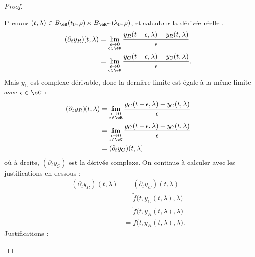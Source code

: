 \begin{proof}
\begin{subproof}
		Prenons \( (t,\lambda)\in B_{\eR}(t_0,\rho)\times B_{\eR^m}(\lambda_0,\rho)\), et calculons la dérivée réelle :
		\begin{subequations}
			\begin{align}
				(\partial_ty_R)(t,\lambda) & =\lim_{\substack{ \epsilon\to 0 \\ \epsilon\in \eR }  }\frac{ y_R(t+\epsilon,\lambda)-y_R(t,\lambda) }{ \epsilon }  \\
				                           & =\lim_{\substack{ \epsilon\to 0 \\ \epsilon\in \eR }  }  \frac{ y_C(t+\epsilon,\lambda)-y_C(t,\lambda) }{ \epsilon }.
			\end{align}
		\end{subequations}
		Mais \( y_C\) est complexe-dérivable, donc la dernière limite est égale à la même limite avec \( \epsilon\in \eC\) :
		\begin{subequations}
			\begin{align}
				(\partial_ty_R)(t,\lambda) & =\lim_{\substack{ \epsilon\to 0 \\ \epsilon\in \eR }  }  \frac{ y_C(t+\epsilon,\lambda)-y_C(t,\lambda) }{ \epsilon }\\
				                           & =\lim_{\substack{ \epsilon\to 0 \\ \epsilon\in \eC }  }  \frac{ y_C(t+\epsilon,\lambda)-y_C(t,\lambda) }{ \epsilon }\\
				                           & =(\partial_ty_C)(t,\lambda)
			\end{align}
		\end{subequations}
		où à droite, \( (\partial_ty_C)\) est la dérivée complexe. On continue à calculer avec les justifications en-dessous :
		\begin{subequations}
			\begin{align}
				(\partial_ty_R)(t,\lambda) & =(\partial_ty_C)(t,\lambda)                   \\
				                           & =\tilde f\big( t,y_C(t,\lambda),\lambda \big) \\
				                           & =\tilde f\big( t,y_R(t,\lambda),\lambda \big) \\
				                           & =f\big( t,y_R(t,\lambda),\lambda \big).
			\end{align}
		\end{subequations}
		Justifications :
		\begin{itemize}

\end{itemize}
\end{subproof}
\end{proof}
